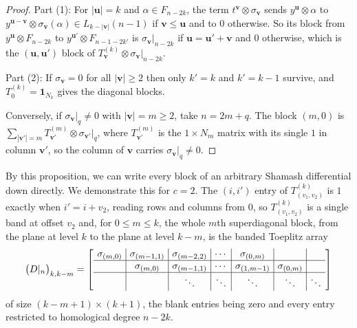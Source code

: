 \documentclass[12pt]{amsart}
\theoremstyle{plain}
\theoremstyle{definition}
\begin{document}
\begin{proof}
    Part (1): For $|\boldsymbol{u}| = k$ and $\alpha \in F_{n-2k}$, the term $t^{\boldsymbol{v}} \otimes \sigma_{\boldsymbol{v}}$ sends $y^{\boldsymbol{u}} \otimes \alpha$ to $y^{\boldsymbol{u}-\boldsymbol{v}} \otimes \sigma_{\boldsymbol{v}}(\alpha) \in L_{k-|\boldsymbol{v}|}(n-1)$ if $\boldsymbol{v} \le \boldsymbol{u}$ and to $0$ otherwise. So its block from $y^{\boldsymbol{u}} \otimes F_{n-2k}$ to $y^{\boldsymbol{u'}} \otimes F_{n-1-2k'}$ is $\sigma_{\boldsymbol{v}}|_{n-2k}$ if $\boldsymbol{u} = \boldsymbol{u'} + \boldsymbol{v}$ and $0$ otherwise, which is the $(\boldsymbol{u}, \boldsymbol{u'})$ block of $T^{(k)}_{\boldsymbol{v}} \otimes \sigma_{\boldsymbol{v}}|_{n-2k}$.

    Part (2): If $\sigma_{\boldsymbol{v}} = 0$ for all $|\boldsymbol{v}| \ge 2$ then only $k' = k$ and $k' = k - 1$ survive, and $T^{(k)}_0 = \mathbf{1}_{N_k}$ gives the diagonal blocks.

    Conversely, if $\sigma_{\boldsymbol{v}}|_q \neq 0$ with $|\boldsymbol{v}| = m \ge 2$, take $n = 2m + q$. The block $(m, 0)$ is ${\sum_{|\boldsymbol{v'}| = m} T^{(m)}_{\boldsymbol{v'}} \otimes \sigma_{\boldsymbol{v'}}|_q}$, where $T^{(m)}_{\boldsymbol{v'}}$ is the $1 \times N_m$ matrix with its single $1$ in column $\boldsymbol{v'}$, so the column of $\boldsymbol{v}$ carries $\sigma_{\boldsymbol{v}}|_q \neq 0$.
\end{proof}

By this proposition, we can write every block of an arbitrary Shamash differential down directly. We demonstrate this for $c=2$. The $(i, i')$ entry of $T^{(k)}_{(v_1, v_2)}$ is $1$ exactly when $i' = i + v_2$, reading rows and columns from $0$, so $T^{(k)}_{(v_1, v_2)}$ is a single band at offset $v_2$ and, for $0 \le m \le k$, the whole $m$th superdiagonal block, from the plane at level $k$ to the plane at level $k - m$, is the banded Toeplitz array
\[
    \bigl(D|_n\bigr)_{k,k-m} =
    \left[\arraycolsep=4pt\begin{array}{c|c|c|c|c|c|c}
        \sigma_{(m,0)} & \sigma_{(m-1,1)} & \sigma_{(m-2,2)} & \cdots & \sigma_{(0,m)} & & \\
        \hline
        & \sigma_{(m,0)} & \sigma_{(m-1,1)} & \cdots & \sigma_{(1,m-1)} &\sigma_{(0,m)} & \\
        \hline
        & & \ddots & \ddots & \ddots & \ddots & \ddots
    \end{array}\right]
\]
of size $(k-m+1) \times (k+1)$, the blank entries being zero and every entry restricted to homological degree $n - 2k$.
\end{document}
